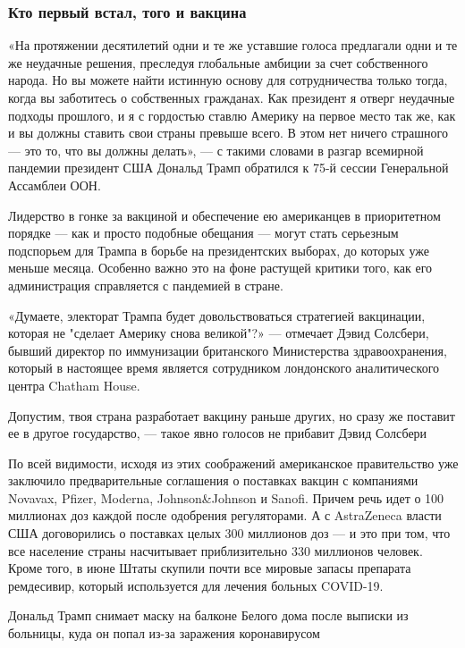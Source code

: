 \subsubsection{Кто первый встал, того и вакцина}
\label{sec:15_10_2020.news.ru.lenta.1_covid}

«На протяжении десятилетий одни и те же уставшие голоса предлагали одни и те же
неудачные решения, преследуя глобальные амбиции за счет собственного народа. Но
вы можете найти истинную основу для сотрудничества только тогда, когда вы
заботитесь о собственных гражданах. Как президент я отверг неудачные подходы
прошлого, и я с гордостью ставлю Америку на первое место так же, как и вы
должны ставить свои страны превыше всего. В этом нет ничего страшного --- это то,
что вы должны делать», --- с такими словами в разгар всемирной пандемии президент
США Дональд Трамп обратился к 75-й сессии Генеральной Ассамблеи ООН.

Лидерство в гонке за вакциной и обеспечение ею американцев в приоритетном
порядке --- как и просто подобные обещания --- могут стать серьезным подспорьем для
Трампа в борьбе на президентских выборах, до которых уже меньше месяца.
Особенно важно это на фоне растущей критики того, как его администрация
справляется с пандемией в стране.

«Думаете, электорат Трампа будет довольствоваться стратегией вакцинации,
которая не "сделает Америку снова великой"?» --- отмечает Дэвид Солсбери, бывший
директор по иммунизации британского Министерства здравоохранения, который в
настоящее время является сотрудником лондонского аналитического центра Chatham
House.

Допустим, твоя страна разработает вакцину раньше других, но сразу же поставит
ее в другое государство, --- такое явно голосов не прибавит Дэвид Солсбери

По всей видимости, исходя из этих соображений американское правительство уже
заключило предварительные соглашения о поставках вакцин с компаниями Novavax,
Pfizer, Moderna, Johnson\&Johnson и Sanofi. Причем речь идет о 100 миллионах
доз каждой после одобрения регуляторами. А с AstraZeneca власти США
договорились о поставках целых 300 миллионов доз --- и это при том, что все
население страны насчитывает приблизительно 330 миллионов человек. Кроме того,
в июне Штаты скупили почти все мировые запасы препарата ремдесивир, который
используется для лечения больных COVID-19.

Дональд Трамп снимает маску на балконе Белого дома после выписки из больницы,
куда он попал из-за заражения коронавирусом

